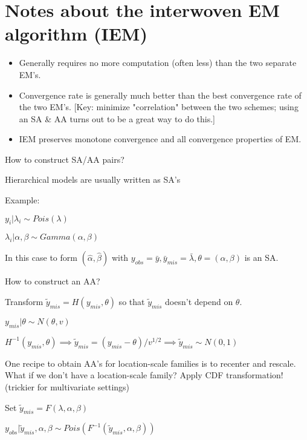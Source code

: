 \documentclass[11pt,letterpaper]{article}
\begin{document}
\section*{Notes about the interwoven EM algorithm (IEM)}
\begin{itemize}
\item 
Generally requires no more computation (often less) than the two separate EM's.
\item Convergence rate is generally much better than the best convergence rate of the two EM's.
[Key: minimize "correlation" between the two schemes; using an SA \& AA turns out to be a great way to do this.]
\item IEM preserves monotone convergence and all convergence properties of EM.
\end{itemize}

How to construct SA/AA pairs?


Hierarchical models are usually written as SA's

Example:	 

$y_i|\lambda_i \sim Pois(\lambda)$ 

$\lambda_i | \alpha, \beta \sim Gamma(\alpha, \beta)$

In this case to form $(\hat{\alpha},\hat{\beta})$ with $y_{obs} = \bar{y}, \bar{y}_{mis} = \bar{\lambda}, \theta = (\alpha,\beta)$ is an SA.

How to construct an AA?

Transform $\tilde{y}_{mis} = H(y_{mis},\theta)$ so that $\tilde{y}_{mis}$ doesn't depend on $\theta$.

$y_{mis}|\theta \sim N(\theta, v)$

$H^{-1} (y_{mis}, \theta) \implies \tilde{y}_{mis} = (y_{mis}-\theta)/v^{1/2} \implies \tilde{y}_{mis} \sim N(0,1)$

One recipe to obtain AA's for location-scale families is to recenter and rescale. What if we don't have a location-scale family? Apply CDF transformation! (trickier for multivariate settings)

Set $\tilde{y}_{mis} = F(\lambda, \alpha, \beta)$

$y_{obs} |\tilde{y}_{mis}, \alpha, \beta \sim Pois(F^{-1}(\tilde{y}_{mis}, \alpha, \beta))$
\end{document}
